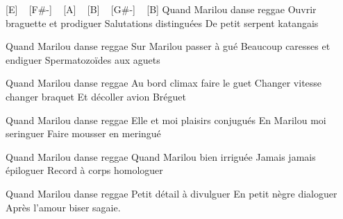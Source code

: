 [E] ~ [F#-] ~ [A] ~ [B] ~ [G#-] ~ [B]
Quand Marilou danse reggae
Ouvrir braguette et prodiguer
Salutations distinguées
De petit serpent katangais


Quand Marilou danse reggae
Sur Marilou passer à gué
Beaucoup caresses et endiguer
Spermatozoïdes aux aguets

Quand Marilou danse reggae
Au bord climax faire le guet
Changer vitesse changer braquet
Et décoller avion Bréguet

Quand Marilou danse reggae
Elle et moi plaisirs conjugués
En Marilou moi seringuer
Faire mousser en meringué

Quand Marilou danse reggae
Quand Marilou bien irriguée
Jamais jamais épiloguer
Record à corps homologuer

Quand Marilou danse reggae
Petit détail à divulguer
En petit nègre dialoguer
Après l'amour biser sagaie. 